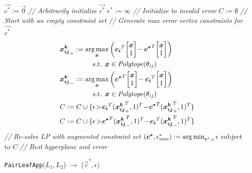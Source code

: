 \incmargin{1.5em}
\linesnumbered
\begin{algorithm}[t!]
\dontprintsemicolon
$\vec{c^*} := \vec{0}$ \emph{// Arbitrarily initialize $\vec{c^*}$}\;
$\epsilon^* := \infty$ \emph{// Initialize to invalid error}\;
$C := \emptyset$ \emph{// Start with an empty constraint set}\;
\emph{// Generate max error vertex constraints for $\vec{c^*}$}\;
 {
\nlset{} \vspace{-7mm}
\begin{align*}
&\vec{x_{ij}^k}_+ := \argmax_{\vec{x}} \left( \vec{c_i}^T \! \mb \vec{x}\\1 \me \! - \vec{c^*}^T \! \mb \vec{x}\\1 \me \right) \\ 
&  \hspace{17mm} \textrm{s.t. } \vec{x} \in \PT(\theta_{ij})\\
&\vec{x_{ij}^k}_- := \argmax_{\vec{x}} \left( \vec{c^*}^T \! \mb \vec{x}\\1 \me \! - \vec{c_i}^T \! \mb \vec{x}\\1 \me \right) \\ 
&  \hspace{17mm} \textrm{s.t. } \vec{x} \in \PT(\theta_{ij})\\
&  C := C \cup \{ \epsilon \!>\! \vec{c_i}^T (\vec{x_{ij}^k}_+^T,1)^T \!-\! \vec{c^*}^T (\vec{x_{ij}^k}_+^T,1)^T \} \\
&  C := C \cup \{ \epsilon \!>\! \vec{c^*}^T (\vec{x_{ij}^k}_-^T,1)^T \!-\! \vec{c_i}^T (\vec{x_{ij}^k}_-^T,1)^T \}
\end{align*}\vspace{-5mm}
}
\emph{// Re-solve LP with augmented constraint set}\;
$(\vec{c^*},\epsilon^*_{\mathit{new}}) := \argmin_{\vec{c}^*,\epsilon} \epsilon$ subject to $C$\;
\emph{// Best hyperplane and error}\;
\caption{\footnotesize 
 \texttt{PairLeafApp}($L_1,L_2$) $\longrightarrow$ ($\vec{c}^*,\epsilon$)}
\label{alg:pairleafapp}
\end{algorithm}
\decmargin{1.5em}

